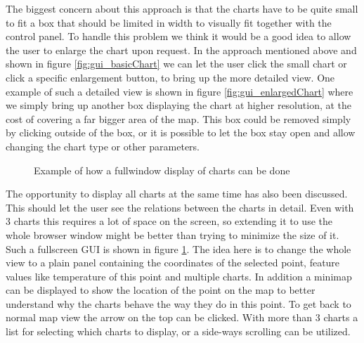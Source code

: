 \documentclass[11pt,a4paper,titlepage,oneside]{report}
\begin{document}
The biggest concern about this approach is that the charts have to be quite small to fit a box that should be limited in width to visually fit together with the control panel. To handle this problem we think it would be a good idea to allow the user to enlarge the chart upon request. In the approach mentioned above and shown in figure \ref{fig:gui_basicChart} we can let the user click the small chart or click a specific enlargement button, to bring up the more detailed view. One example of such a detailed view is shown in figure \ref{fig:gui_enlargedChart} where we simply bring up another box displaying the chart at higher resolution, at the cost of covering a far bigger area of the map. This box could be removed simply by clicking outside of the box, or it is possible to let the box stay open and allow changing the chart type or other parameters.
\begin{figure}[!htb]
  \begin{center}
    \caption{Example of how a fullwindow display of charts can be done}
    \label{fig:gui_panelChart}
  \end{center}
\end{figure}

The opportunity to display all charts at the same time has also been discussed. This should let the user see the relations between the charts in detail. Even with 3 charts this requires a lot of space on the screen, so extending it to use the whole browser window might be better than trying to minimize the size of it. Such a fullscreen \gls{GUI} is shown in figure \ref{fig:gui_panelChart}. The idea here is to change the whole view to a plain panel containing the coordinates of the selected point, feature values like temperature of this point and multiple charts. In addition a minimap can be displayed to show the location of the point on the map to better understand why the charts behave the way they do in this point. To get back to normal map view the arrow on the top can be clicked. With more than 3 charts a list for selecting which charts to display, or a side-ways scrolling can be utilized.
\end{document}

